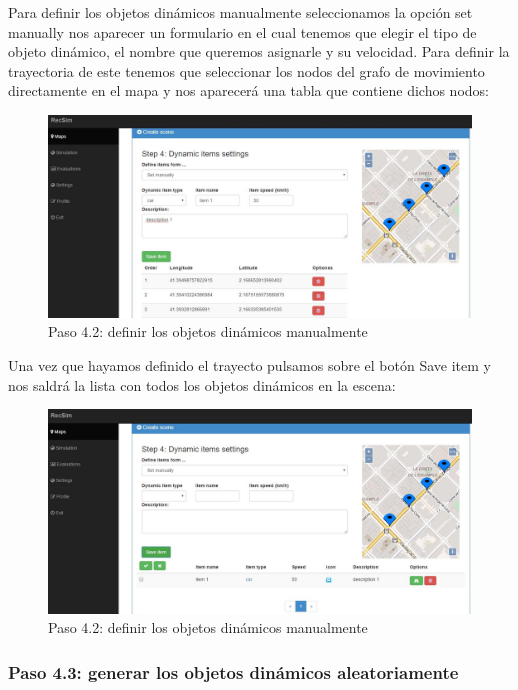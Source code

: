 Para definir los objetos dinámicos manualmente seleccionamos la opción set manually nos aparecer un formulario en el cual tenemos que elegir el tipo de objeto dinámico, el nombre que queremos asignarle y su velocidad. Para definir la trayectoria de este tenemos que seleccionar los nodos del grafo de movimiento directamente en el mapa y nos aparecerá una tabla que contiene dichos nodos:

\begin{figure}[H]
	\centering\includegraphics[scale=0.35]{imagenes/capitulo9/crear-escena-6.JPG}
	\caption{Paso 4.2: definir los objetos dinámicos manualmente}
	\label{img:paso4-2-1}
\end{figure}

Una vez que hayamos definido el trayecto pulsamos sobre el botón Save item y nos saldrá la lista con todos los objetos dinámicos en la escena:

\begin{figure}[H]
	\centering\includegraphics[scale=0.35]{imagenes/capitulo9/crear-escena-7.JPG}
	\caption{Paso 4.2: definir los objetos dinámicos manualmente}
	\label{img:paso4-2-2}
\end{figure}

\subsubsection{Paso 4.3: generar los objetos dinámicos aleatoriamente}

